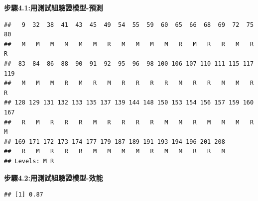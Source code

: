 \documentclass[]{book}
\newenvironment{Shaded}{\begin{snugshade}}{\end{snugshade}}
\newcommand{\CommentTok}[1]{\textcolor[rgb]{0.56,0.35,0.01}{\textit{#1}}}
\newcommand{\DataTypeTok}[1]{\textcolor[rgb]{0.13,0.29,0.53}{#1}}
\newcommand{\FloatTok}[1]{\textcolor[rgb]{0.00,0.00,0.81}{#1}}
\newcommand{\KeywordTok}[1]{\textcolor[rgb]{0.13,0.29,0.53}{\textbf{#1}}}
\newcommand{\NormalTok}[1]{#1}
\newcommand{\OperatorTok}[1]{\textcolor[rgb]{0.81,0.36,0.00}{\textbf{#1}}}
\newcommand{\StringTok}[1]{\textcolor[rgb]{0.31,0.60,0.02}{#1}}
\begin{document}
\textbf{步驟4.1:用測試組驗證模型-預測}

\begin{Shaded}
\end{Shaded}

\begin{verbatim}
##   9  32  38  41  43  45  49  54  55  59  60  65  66  68  69  72  75  80 
##   M   M   M   M   M   M   R   M   M   M   M   R   M   R   R   M   R   R 
##  83  84  86  88  90  91  92  95  96  98 100 106 107 110 111 115 117 119 
##   M   M   M   R   M   R   M   R   R   R   R   M   R   R   M   M   R   R 
## 128 129 131 132 133 135 137 139 144 148 150 153 154 156 157 159 160 167 
##   R   M   R   R   R   M   R   R   R   R   M   M   R   M   M   M   R   M 
## 169 171 172 173 174 177 179 187 189 191 193 194 196 201 208 
##   R   M   R   R   R   M   M   M   M   R   M   M   R   R   M 
## Levels: M R
\end{verbatim}

\textbf{步驟4.2:用測試組驗證模型-效能}

\begin{Shaded}
\end{Shaded}

\begin{verbatim}
## [1] 0.87
\end{verbatim}

\begin{Shaded}
\end{Shaded}
\end{document}
